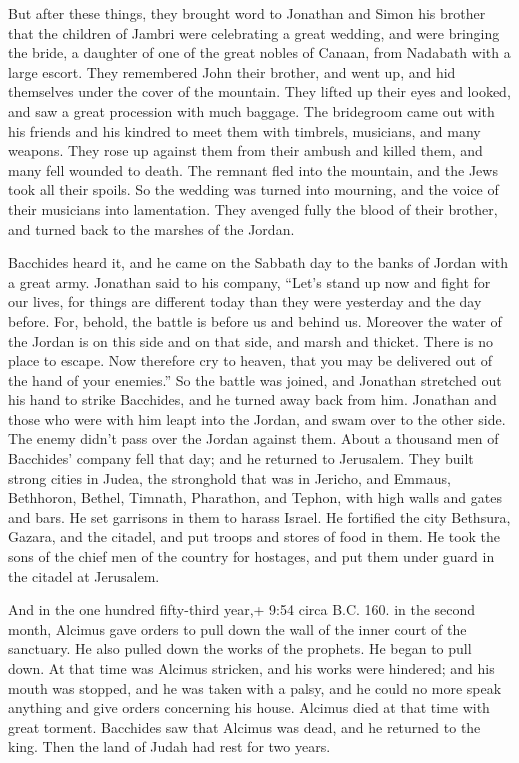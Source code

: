  But after these things, they brought word to Jonathan and
Simon his brother that the children of Jambri were celebrating a great
wedding, and were bringing the bride, a daughter of one of the great
nobles of Canaan, from Nadabath with a large escort.  They
remembered John their brother, and went up, and hid themselves under the
cover of the mountain.  They lifted up their eyes and
looked, and saw a great procession with much baggage. The bridegroom
came out with his friends and his kindred to meet them with timbrels,
musicians, and many weapons.  They rose up against them
from their ambush and killed them, and many fell wounded to death. The
remnant fled into the mountain, and the Jews took all their spoils.
 So the wedding was turned into mourning, and the voice of
their musicians into lamentation.  They avenged fully the
blood of their brother, and turned back to the marshes of the Jordan.

 Bacchides heard it, and he came on the Sabbath day to the
banks of Jordan with a great army.  Jonathan said to his
company, ``Let's stand up now and fight for our lives, for things are
different today than they were yesterday and the day before.
 For, behold, the battle is before us and behind us.
Moreover the water of the Jordan is on this side and on that side, and
marsh and thicket. There is no place to escape.  Now
therefore cry to heaven, that you may be delivered out of the hand of
your enemies.''  So the battle was joined, and Jonathan
stretched out his hand to strike Bacchides, and he turned away back from
him.  Jonathan and those who were with him leapt into the
Jordan, and swam over to the other side. The enemy didn't pass over the
Jordan against them.  About a thousand men of Bacchides'
company fell that day;  and he returned to Jerusalem. They
built strong cities in Judea, the stronghold that was in Jericho, and
Emmaus, Bethhoron, Bethel, Timnath, Pharathon, and Tephon, with high
walls and gates and bars.  He set garrisons in them to
harass Israel.  He fortified the city Bethsura, Gazara, and
the citadel, and put troops and stores of food in them.  He
took the sons of the chief men of the country for hostages, and put them
under guard in the citadel at Jerusalem.

 And in the one hundred fifty-third year,+ 9:54 circa B.C.
160. in the second month, Alcimus gave orders to pull down the wall of
the inner court of the sanctuary. He also pulled down the works of the
prophets.  He began to pull down. At that time was Alcimus
stricken, and his works were hindered; and his mouth was stopped, and he
was taken with a palsy, and he could no more speak anything and give
orders concerning his house.  Alcimus died at that time
with great torment.  Bacchides saw that Alcimus was dead,
and he returned to the king. Then the land of Judah had rest for two
years.

